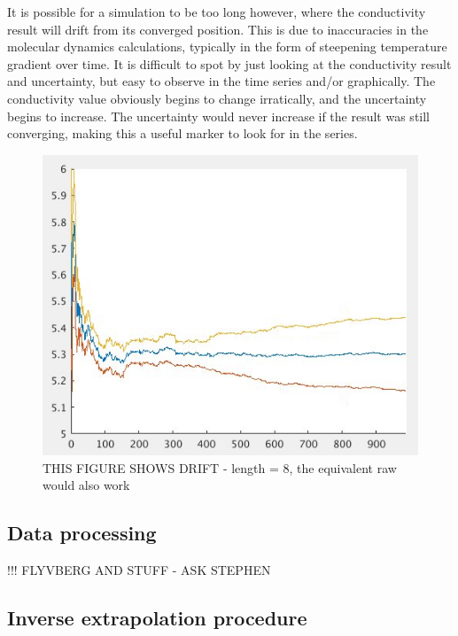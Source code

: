 \pagebreak

It is possible for a simulation to be too long however, where the conductivity result will drift from its converged position. This is due to inaccuracies in the molecular dynamics calculations, typically in the form of steepening temperature gradient over time. It is difficult to spot by just looking at the conductivity result and uncertainty, but easy to observe in the time series and/or graphically. The conductivity value obviously begins to change irratically, and the uncertainty begins to increase. The uncertainty would never increase if the result was still converging, making this a useful marker to look for in the series.

\begin{figure}[h!]
\includegraphics[width=\linewidth]{Figures/direct_trim_drift_4000_2x2.png}
\caption[direct conv]{THIS FIGURE SHOWS DRIFT - length = 8, the equivalent raw would also work}
\label{fig:direct_drift}
\end{figure}

\pagebreak

\subsection{\label{sec:3.DM.data}Data processing}

!!! FLYVBERG AND STUFF - ASK STEPHEN


\subsection{\label{sec:3.DM.extrap}Inverse extrapolation procedure}

